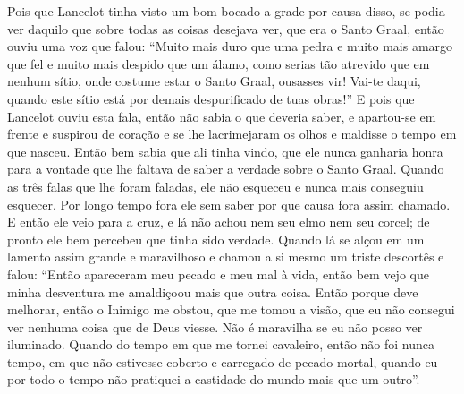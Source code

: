 Pois que Lancelot tinha visto um bom bocado a grade por causa disso, se podia
ver daquilo que sobre todas as coisas desejava ver, que era o Santo Graal,
então ouviu uma voz que falou: “Muito mais duro que uma pedra e muito mais
amargo que fel e muito mais despido que um álamo, como serias tão atrevido que
em nenhum sítio, onde costume estar o Santo Graal, ousasses vir! Vai-te daqui,
quando este sítio está por demais despurificado de tuas obras!” E
pois que Lancelot ouviu esta fala, então não sabia o que deveria saber, e
apartou-se em frente e suspirou de coração e se lhe lacrimejaram os olhos e
maldisse o tempo em que nasceu. Então bem sabia que ali tinha vindo, que ele
nunca ganharia honra para a vontade que lhe faltava de saber a verdade sobre o
Santo Graal. Quando as três falas que lhe foram faladas, ele não esqueceu e
nunca mais conseguiu esquecer. Por longo tempo fora ele sem saber por que causa
fora assim chamado. E então ele veio para a cruz, e lá não achou nem
seu elmo nem seu corcel; de pronto ele bem percebeu que tinha sido verdade.
Quando lá se alçou em um lamento assim grande e maravilhoso e chamou a si mesmo
um triste descortês e falou: “Então apareceram meu pecado e meu mal à vida,
então bem vejo que minha desventura me amaldiçoou mais que outra coisa. Então
porque deve melhorar, então o Inimigo me obstou, que me tomou a visão, que eu
não consegui ver nenhuma coisa que de Deus viesse. Não é maravilha se eu não
posso ver iluminado. Quando do tempo em que me tornei cavaleiro, então não foi
nunca tempo, em que não estivesse coberto e carregado de pecado mortal, quando
eu por todo o tempo não pratiquei a castidade do mundo mais que um outro”. 

